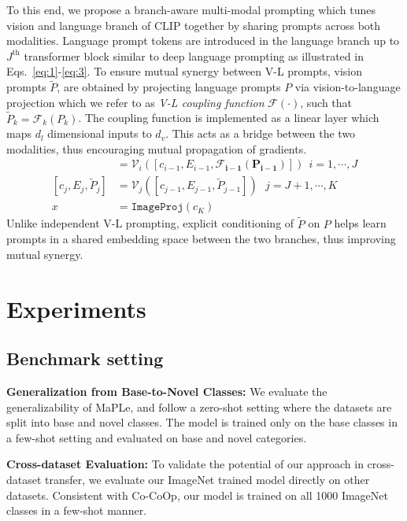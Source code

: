 \documentclass[10pt,twocolumn,letterpaper]{article}
\begin{document}
To this end, we propose a branch-aware multi-modal prompting which tunes vision and language branch of CLIP together by sharing prompts across both modalities. Language prompt tokens are introduced in the language branch up to $J^{\text{th}}$ transformer block similar to deep language prompting as illustrated in Eqs.~\ref{eq:1}-\ref{eq:3}. To ensure mutual synergy between V-L prompts, vision prompts $\tilde{P}$, are obtained by projecting language prompts $P$ via vision-to-language projection which we refer to as \textit{V-L coupling function} $\mathcal{F(\cdot)}$, such that $\tilde{P}_k= {\mathcal{F}_k(P_k)}$. The coupling function is implemented as a linear layer which maps $d_l$ dimensional inputs to $d_v$. This acts as a bridge between the two modalities, thus encouraging mutual propagation of gradients.
\begin{align*}
[c_i, E_i, \ \underline{\hspace{0.3cm}} \ ] &= \mathcal{V}_{i}([c_{i-1}, E_{i-1},\boldsymbol{\mathcal{F}_{i-1}(P_{i-1})}])  \ ~ i=1, \cdots, J \\
[c_j, E_j, \tilde{P}_{j}] &= \mathcal{V}_{j}([c_{j-1}, E_{j-1}, \tilde{P}_{j-1}])  \ \ ~  j=J+1, \cdots, K\\
x &= \texttt{ImageProj}({c}_K)
\end{align*}
Unlike independent V-L prompting, explicit conditioning of $\tilde{P}$ on $P$ helps learn prompts in a shared embedding space between the two branches, thus improving mutual synergy. 

\section{Experiments}
\subsection{Benchmark setting}


\noindent \textbf{Generalization from Base-to-Novel Classes:} We evaluate the generalizability of MaPLe, and follow a zero-shot setting where the datasets are split into base and novel classes. The model is trained only on the base classes in a few-shot setting and evaluated on base and novel categories.

\noindent  \textbf{Cross-dataset Evaluation:} To validate the potential of our approach in cross-dataset transfer, we evaluate  our ImageNet trained model directly on other datasets. Consistent with Co-CoOp, our model is trained on all 1000 ImageNet classes in a few-shot manner.
\end{document}
